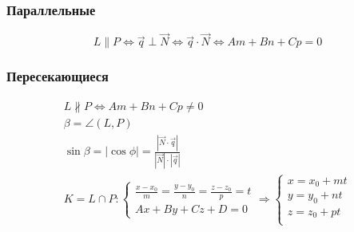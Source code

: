\documentclass{article}
\begin{document}
\subsubsection{Параллельные}

\[
	L \parallel P \Leftrightarrow
	\vec{q} \perp \vec{N} \Leftrightarrow
	\vec{q} \cdot \vec{N} \Leftrightarrow
	Am + Bn + Cp = 0
\]

\subsubsection{Пересекающиеся}

\begin{gather*}
	L \not \parallel P \Leftrightarrow Am + Bn + Cp \ne 0 \\
	\beta = \angle(L, P) \\
	\sin \beta = |\cos \phi| = \frac{|\vec{N} \cdot \vec{q}|}{|\vec{N}| \cdot |\vec{q}|} \\
	K = L \cap P : \begin{cases}
		\frac{x - x_0}{m} = \frac{y - y_0}{n} = \frac{z - z_0}{p} = t \\
		Ax + By + Cz + D = 0
	\end{cases} \Rightarrow \begin{cases}
		x = x_0 + mt \\
		y = y_0 + nt \\
		z = z_0 + pt \\
	\end{cases}
\end{gather*}
\end{document}
